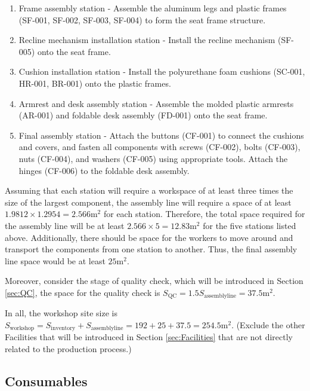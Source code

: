 \begin{enumerate}
    \item Frame assembly station - Assemble the aluminum legs and plastic frames (SF-001, SF-002, SF-003, SF-004) to form the seat frame structure.
    
    \item  Recline mechanism installation station - Install the recline mechanism (SF-005) onto the seat frame.
    
    \item  Cushion installation station - Install the polyurethane foam cushions (SC-001, HR-001, BR-001) onto the plastic frames.
    
    \item  Armrest and desk assembly station - Assemble the molded plastic armrests (AR-001) and foldable desk assembly (FD-001) onto the seat frame.
    
    \item Final assembly station - Attach the buttons (CF-001) to connect the cushions and covers, and fasten all components with screws (CF-002), bolts (CF-003), nuts (CF-004), and washers (CF-005) using appropriate tools. Attach the hinges (CF-006) to the foldable desk assembly.
\end{enumerate}

Assuming that each station will require a workspace of at least three times the size of the largest component, the assembly line will require a space of at least $1.9812 \times 1.2954 = 2.566\mathrm{m^2}$ for each station. Therefore, the total space required for the assembly line will be at least $2.566\times5=12.83\mathrm{m^2}$ for the five stations listed above. Additionally, there should be space for the workers to move around and transport the components from one station to another. Thus, the final assembly line space would be at least $25\mathrm{m^2}$.

Moreover, consider the stage of quality check, which will be introduced in Section \ref{sec:QC}, the space for the quality check is $S_\mathrm{QC}=1.5S_\mathrm{assembly line}=37.5\mathrm{m^2}$.

In all, the workshop site size is $S_\mathrm{workshop}=S_\mathrm{inventory}+S_\mathrm{assembly line}=192+25+37.5=254.5\mathrm{m^2}$. (Exclude the other Facilities that will be introduced in Section \ref{sec:Facilities} that are not directly related to the production process.)


\subsection{Consumables}
